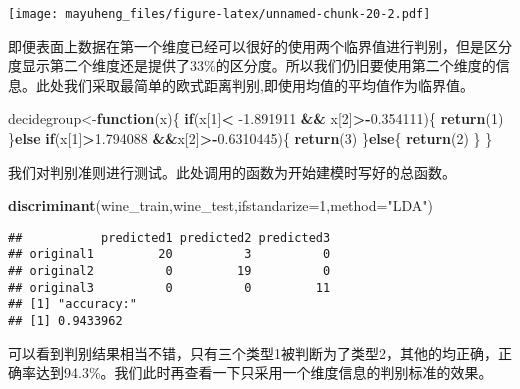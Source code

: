 \documentclass[]{article}
\newenvironment{Shaded}{\begin{snugshade}}{\end{snugshade}}
\newcommand{\ControlFlowTok}[1]{\textcolor[rgb]{0.13,0.29,0.53}{\textbf{#1}}}
\newcommand{\DataTypeTok}[1]{\textcolor[rgb]{0.13,0.29,0.53}{#1}}
\newcommand{\DecValTok}[1]{\textcolor[rgb]{0.00,0.00,0.81}{#1}}
\newcommand{\FloatTok}[1]{\textcolor[rgb]{0.00,0.00,0.81}{#1}}
\newcommand{\KeywordTok}[1]{\textcolor[rgb]{0.13,0.29,0.53}{\textbf{#1}}}
\newcommand{\NormalTok}[1]{#1}
\newcommand{\OperatorTok}[1]{\textcolor[rgb]{0.81,0.36,0.00}{\textbf{#1}}}
\newcommand{\StringTok}[1]{\textcolor[rgb]{0.31,0.60,0.02}{#1}}
\begin{document}
\texttt{[image: mayuheng\_files/figure-latex/unnamed-chunk-20-2.pdf]}

即便表面上数据在第一个维度已经可以很好的使用两个临界值进行判别，但是区分度显示第二个维度还是提供了33\%的区分度。所以我们仍旧要使用第二个维度的信息。此处我们采取最简单的欧式距离判别,即使用均值的平均值作为临界值。

\begin{Shaded}
\begin{Highlighting}[]
\NormalTok{decidegroup<-}\ControlFlowTok{function}\NormalTok{(x)\{}
  \ControlFlowTok{if}\NormalTok{(x[}\DecValTok{1}\NormalTok{]}\OperatorTok{<}\StringTok{ }\FloatTok{-1.891911} \OperatorTok{&&}\StringTok{ }\NormalTok{x[}\DecValTok{2}\NormalTok{]}\OperatorTok{>-}\FloatTok{0.354111}\NormalTok{)\{}
    \KeywordTok{return}\NormalTok{(}\DecValTok{1}\NormalTok{)}
\NormalTok{  \}}\ControlFlowTok{else} \ControlFlowTok{if}\NormalTok{(x[}\DecValTok{1}\NormalTok{]}\OperatorTok{>}\FloatTok{1.794088} \OperatorTok{&&}\NormalTok{x[}\DecValTok{2}\NormalTok{]}\OperatorTok{>-}\FloatTok{0.6310445}\NormalTok{)\{}
    \KeywordTok{return}\NormalTok{(}\DecValTok{3}\NormalTok{)}
\NormalTok{  \}}\ControlFlowTok{else}\NormalTok{\{}
    \KeywordTok{return}\NormalTok{(}\DecValTok{2}\NormalTok{)}
\NormalTok{  \}  }
\NormalTok{\}}
\end{Highlighting}
\end{Shaded}

我们对判别准则进行测试。此处调用的函数为开始建模时写好的总函数。

\begin{Shaded}
\begin{Highlighting}[]
\KeywordTok{discriminant}\NormalTok{(wine_train,wine_test,}\DataTypeTok{ifstandarize=}\DecValTok{1}\NormalTok{,}\DataTypeTok{method=}\StringTok{"LDA"}\NormalTok{)}
\end{Highlighting}
\end{Shaded}

\begin{verbatim}
##           predicted1 predicted2 predicted3
## original1         20          3          0
## original2          0         19          0
## original3          0          0         11
## [1] "accuracy:"
## [1] 0.9433962
\end{verbatim}

可以看到判别结果相当不错，只有三个类型1被判断为了类型2，其他的均正确，正确率达到94.3\%。我们此时再查看一下只采用一个维度信息的判别标准的效果。
\end{document}
